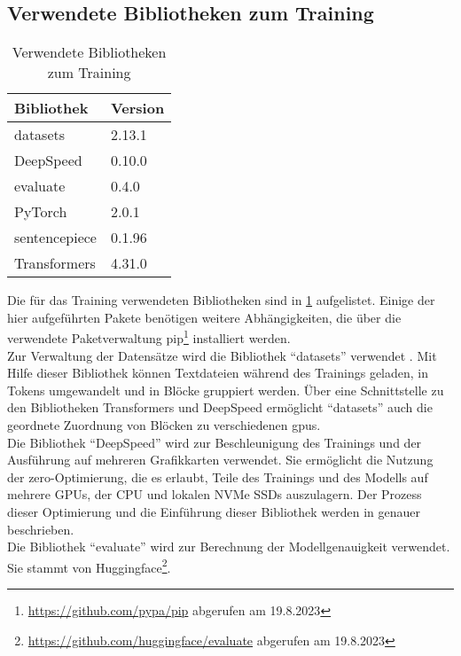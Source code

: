 \subsection{Verwendete Bibliotheken zum Training}
\begin{table}
    \centering
    \begin{tabular}{ll}
        \toprule
        \textbf{Bibliothek} & \textbf{Version} \\
        \midrule
        datasets            & 2.13.1           \\
        DeepSpeed           & 0.10.0           \\
        evaluate            & 0.4.0            \\
        PyTorch             & 2.0.1            \\
        sentencepiece       & 0.1.96           \\
        Transformers        & 4.31.0           \\
        \bottomrule
    \end{tabular}
    \caption{Verwendete Bibliotheken zum Training}
    \label{tab:training-libraries}
\end{table}
Die für das Training verwendeten Bibliotheken sind in \cref{tab:training-libraries} aufgelistet.
Einige der hier aufgeführten Pakete benötigen weitere Abhängigkeiten, die über die verwendete Paketverwaltung \ac{pip}\footnote{\url{https://github.com/pypa/pip} abgerufen am 19.8.2023} installiert werden.\\

Zur Verwaltung der Datensätze wird die Bibliothek \enquote{datasets} verwendet \citep{datasets}.
Mit Hilfe dieser Bibliothek können Textdateien während des Trainings geladen, in Tokens umgewandelt und in Blöcke gruppiert werden.
Über eine Schnittstelle zu den Bibliotheken Transformers und DeepSpeed ermöglicht \enquote{datasets} auch die geordnete Zuordnung von Blöcken zu verschiedenen \ac{gpu}s.\\

Die Bibliothek \enquote{DeepSpeed} wird zur Beschleunigung des Trainings und der Ausführung auf mehreren Grafikkarten verwendet.
Sie ermöglicht die Nutzung der \ac{zero}-Optimierung, die es erlaubt, Teile des Trainings und des Modells auf mehrere GPUs, der CPU und lokalen NVMe SSDs auszulagern.
Der Prozess dieser Optimierung und die Einführung dieser Bibliothek werden in \citet{deepspeed} genauer beschrieben.\\

Die Bibliothek \enquote{evaluate} wird zur Berechnung der Modellgenauigkeit verwendet.
Sie stammt von Huggingface\footnote{\url{https://github.com/huggingface/evaluate} abgerufen am 19.8.2023}.\\

